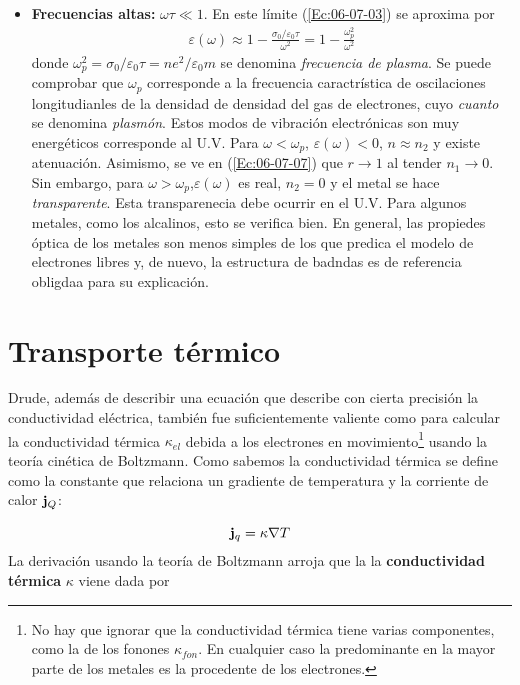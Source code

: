 \begin{itemize}
	\item \textbf{Frecuencias altas:} $\omega \tau \ll 1$. En este límite (\ref{Ec:06-07-03}) se aproxima por 
	\begin{eqnarray}
		\varepsilon (\omega) \approx 1 - \frac{\sigma_0 /\varepsilon_0 \tau}{\omega^2} = 1 - \frac{\omega_p^2}{\omega^2}
	\end{eqnarray}
	donde $\omega_p^2 = \sigma_0 / \varepsilon_0 \tau = ne^2 / \varepsilon_0 m$ se denomina \textit{frecuencia de plasma}. Se puede comprobar que $\omega_p$ corresponde a la frecuencia caractrística de oscilaciones longitudianles de la densidad de densidad del gas de electrones, cuyo \textit{cuanto} se denomina \textit{plasmón}. Estos modos de vibración electrónicas son muy energéticos corresponde al U.V. Para $\omega < \omega_p$, $\varepsilon(\omega)<0$, $n\approx n_2$ y existe atenuación. Asimismo, se ve en (\ref{Ec:06-07-07}) que $r \rightarrow 1$ al tender $n_1 \rightarrow 0$. Sin embargo, para $\omega > \omega_p$,$\varepsilon(\omega)$ es real, $n_2=0$ y el metal se hace \textit{transparente}. Esta transparenecia debe ocurrir en el U.V. Para algunos metales, como los alcalinos, esto se verifica bien. En general, las propiedes óptica de los metales son menos simples de los que predica el modelo de electrones libres y, de nuevo, la estructura de badndas es de referencia obligdaa para su explicación.
\end{itemize}

\section{Transporte térmico}

Drude, además de describir una ecuación que describe con cierta precisión la conductividad eléctrica, también fue suficientemente valiente como para calcular la conductividad térmica $\kappa_{el}$ debida a los electrones en movimiento\footnote{No hay que ignorar que la conductividad térmica tiene varias componentes, como la de los fonones $\kappa_{fon}$. En cualquier caso la predominante en la mayor parte de los metales es la procedente de los electrones.} usando la teoría cinética de Boltzmann. Como sabemos la conductividad térmica se define como la constante que relaciona un gradiente de temperatura y la corriente de calor $\mathbf{j}_Q$:

\begin{equation}
	\mathbf{j}_q = \kappa \nabla T
\end{equation}
La derivación usando la teoría de Boltzmann arroja que la la \textbf{conductividad térmica} $\kappa$ viene dada por

